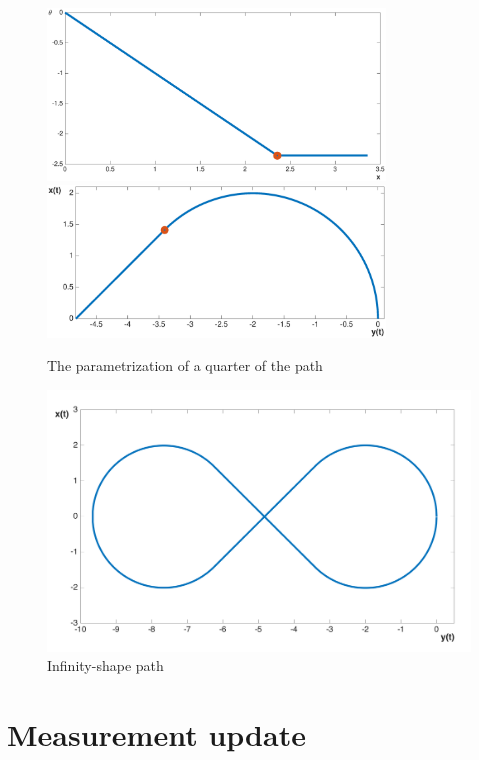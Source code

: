 \begin{figure}[!tbp]
  \centering
 {\includegraphics[width=0.8\textwidth]{img/angle_x.eps}\label{fig:quarter_theta}}
  \hfill
  {\includegraphics[width=0.8\textwidth]{img/path_x_quarter.eps}\label{fig:quarter_xy}}
  \caption{The parametrization of a quarter of the path}
  \label{fig:quarter_path}
\end{figure}

\begin{figure}[!ht]
    \centering
    \includegraphics[width=1\textwidth]{img/infinityshapepath.png}
    \caption{Infinity-shape path}
    \label{fig:entire_path}
\end{figure}

\section{Measurement update}
